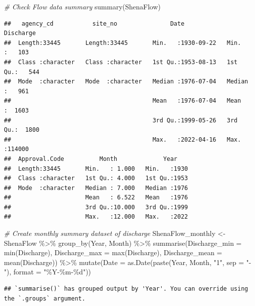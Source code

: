 \documentclass[
  12pt,
]{article}
\newenvironment{Shaded}{\begin{snugshade}}{\end{snugshade}}
\newcommand{\AttributeTok}[1]{\textcolor[rgb]{0.77,0.63,0.00}{#1}}
\newcommand{\CommentTok}[1]{\textcolor[rgb]{0.56,0.35,0.01}{\textit{#1}}}
\newcommand{\FunctionTok}[1]{\textcolor[rgb]{0.00,0.00,0.00}{#1}}
\newcommand{\NormalTok}[1]{#1}
\newcommand{\OtherTok}[1]{\textcolor[rgb]{0.56,0.35,0.01}{#1}}
\newcommand{\SpecialCharTok}[1]{\textcolor[rgb]{0.00,0.00,0.00}{#1}}
\newcommand{\StringTok}[1]{\textcolor[rgb]{0.31,0.60,0.02}{#1}}
\begin{document}
\begin{Shaded}
\begin{Highlighting}[]
\CommentTok{\# Check Flow data summary}
\FunctionTok{summary}\NormalTok{(ShenaFlow)}
\end{Highlighting}
\end{Shaded}

\begin{verbatim}
##   agency_cd           site_no               Date              Discharge     
##  Length:33445       Length:33445       Min.   :1930-09-22   Min.   :   103  
##  Class :character   Class :character   1st Qu.:1953-08-13   1st Qu.:   544  
##  Mode  :character   Mode  :character   Median :1976-07-04   Median :   961  
##                                        Mean   :1976-07-04   Mean   :  1603  
##                                        3rd Qu.:1999-05-26   3rd Qu.:  1800  
##                                        Max.   :2022-04-16   Max.   :114000  
##  Approval.Code          Month             Year     
##  Length:33445       Min.   : 1.000   Min.   :1930  
##  Class :character   1st Qu.: 4.000   1st Qu.:1953  
##  Mode  :character   Median : 7.000   Median :1976  
##                     Mean   : 6.522   Mean   :1976  
##                     3rd Qu.:10.000   3rd Qu.:1999  
##                     Max.   :12.000   Max.   :2022
\end{verbatim}

\begin{Shaded}
\begin{Highlighting}[]
\CommentTok{\# Create monthly summary dataset of discharge}
\NormalTok{ShenaFlow\_monthly }\OtherTok{\textless{}{-}}\NormalTok{ ShenaFlow }\SpecialCharTok{\%\textgreater{}\%}
  \FunctionTok{group\_by}\NormalTok{(Year, Month) }\SpecialCharTok{\%\textgreater{}\%}
  \FunctionTok{summarise}\NormalTok{(}\AttributeTok{Discharge\_min =} \FunctionTok{min}\NormalTok{(Discharge),}
            \AttributeTok{Discharge\_max =} \FunctionTok{max}\NormalTok{(Discharge),}
            \AttributeTok{Discharge\_mean =} \FunctionTok{mean}\NormalTok{(Discharge)) }\SpecialCharTok{\%\textgreater{}\%}
  \FunctionTok{mutate}\NormalTok{(}\AttributeTok{Date =} \FunctionTok{as.Date}\NormalTok{(}\FunctionTok{paste}\NormalTok{(Year, Month, }\StringTok{"1"}\NormalTok{, }\AttributeTok{sep =} \StringTok{"{-}"}\NormalTok{), }\AttributeTok{format =} \StringTok{"\%Y{-}\%m{-}\%d"}\NormalTok{))}
\end{Highlighting}
\end{Shaded}

\begin{verbatim}
## `summarise()` has grouped output by 'Year'. You can override using the `.groups` argument.
\end{verbatim}
\end{document}
